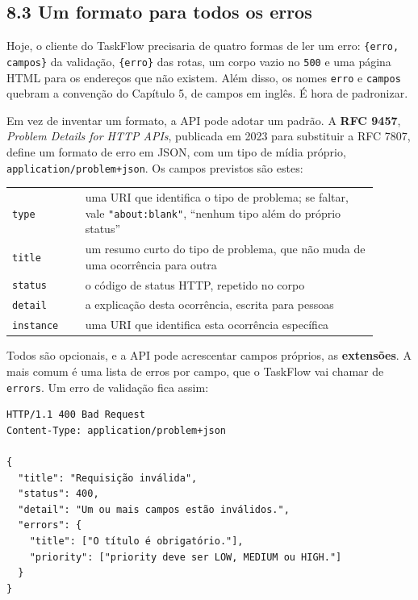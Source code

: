 \subsection{8.3 Um formato para todos os erros}

Hoje, o cliente do TaskFlow precisaria de quatro formas de ler um erro: \texttt{\{erro, campos\}} da validação, \texttt{\{erro\}} das rotas, um corpo vazio no \texttt{500} e uma página HTML para os endereços que não existem. Além disso, os nomes \texttt{erro} e \texttt{campos} quebram a convenção do Capítulo 5, de campos em inglês. É hora de padronizar.

Em vez de inventar um formato, a API pode adotar um padrão. A \textbf{RFC 9457}, \textit{Problem Details for HTTP APIs}, publicada em 2023 para substituir a RFC 7807, define um formato de erro em JSON, com um tipo de mídia próprio, \texttt{application/problem+json}. Os campos previstos são estes:

\begin{center}
\begin{tabular}{@{}P{0.18\linewidth}P{0.72\linewidth}@{}}
\toprule
{}
 &  \\
\midrule
\texttt{type} & uma URI que identifica o tipo de problema; se faltar, vale \texttt{"about:blank"}, ``nenhum tipo além do próprio status'' \\
 \texttt{title} & um resumo curto do tipo de problema, que não muda de uma ocorrência para outra \\
\texttt{status} & o código de status HTTP, repetido no corpo \\
 \texttt{detail} & a explicação desta ocorrência, escrita para pessoas \\
\texttt{instance} & uma URI que identifica esta ocorrência específica \\
\bottomrule
\end{tabular}
\end{center}

Todos são opcionais, e a API pode acrescentar campos próprios, as \textbf{extensões}. A mais comum é uma lista de erros por campo, que o TaskFlow vai chamar de \texttt{errors}. Um erro de validação fica assim:

\begin{codigo}
\begin{Verbatim}[breaklines=true, breaksymbolleft={}, fontsize=\footnotesize]
HTTP/1.1 400 Bad Request
Content-Type: application/problem+json

{
  "title": "Requisição inválida",
  "status": 400,
  "detail": "Um ou mais campos estão inválidos.",
  "errors": {
    "title": ["O título é obrigatório."],
    "priority": ["priority deve ser LOW, MEDIUM ou HIGH."]
  }
}
\end{Verbatim}
\end{codigo}

